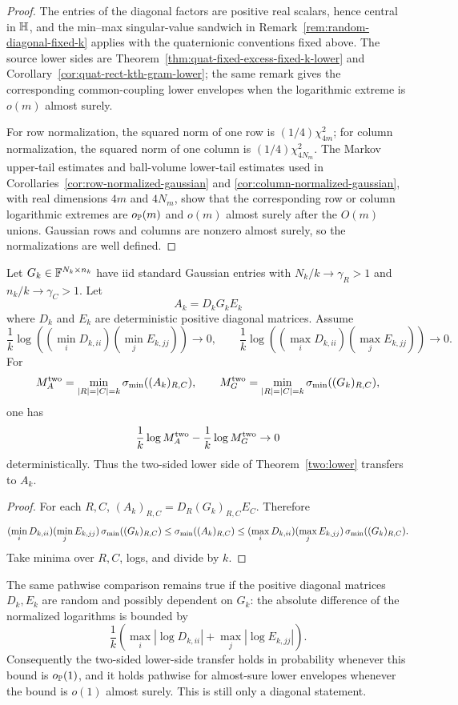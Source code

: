 \begin{proof}
The entries of the diagonal factors are positive real scalars, hence central in
\(\mathbb{H}\), and the min--max singular-value sandwich in
Remark~\ref{rem:random-diagonal-fixed-k} applies with the quaternionic
conventions fixed above.  The source lower sides are
Theorem~\ref{thm:quat-fixed-excess-fixed-k-lower} and
Corollary~\ref{cor:quat-rect-kth-gram-lower}; the same remark gives the
corresponding common-coupling lower envelopes when the logarithmic extreme is
\(o(m)\) almost surely.

For row normalization, the squared norm of one row is \((1/4)\chi^2_{4m}\); for
column normalization, the squared norm of one column is \((1/4)\chi^2_{4N_m}\).
The Markov upper-tail estimates and ball-volume lower-tail estimates used in
Corollaries~\ref{cor:row-normalized-gaussian} and
\ref{cor:column-normalized-gaussian}, with real dimensions \(4m\) and \(4N_m\),
show that the corresponding row or column logarithmic extremes are \(o_{\mathbb{P}}(m)\)
and \(o(m)\) almost surely after the \(O(m)\) unions.  Gaussian rows and columns
are nonzero almost surely, so the normalizations are well defined.
\end{proof}

\begin{corollary}\label{cor:two-sided-diagonal-transfer}
Let \(G_k\in\mathbb{F}^{N_k\times n_k}\) have iid standard Gaussian entries with
\(N_k/k\to\gamma_R>1\) and \(n_k/k\to\gamma_C>1\).  Let
\[
  A_k=D_kG_kE_k
\]
where \(D_k\) and \(E_k\) are deterministic positive diagonal matrices.  Assume
\[
  \frac1k\log\!\left((\min_i D_{k,ii})(\min_j E_{k,jj})\right)\to0,\qquad
  \frac1k\log\!\left((\max_i D_{k,ii})(\max_j E_{k,jj})\right)\to0.
\]
For
\[
  M_A^{\rm two}=\min_{|R|=|C|=k}\sigma_{\min}((A_k)_{R,C}),\qquad
  M_G^{\rm two}=\min_{|R|=|C|=k}\sigma_{\min}((G_k)_{R,C}),
\]
one has
\[
  \frac1k\log M_A^{\rm two}-\frac1k\log M_G^{\rm two}\to0
\]
deterministically.  Thus the two-sided lower side of
Theorem~\ref{two:lower} transfers to \(A_k\).
\end{corollary}

\begin{proof}
For each \(R,C\), \((A_k)_{R,C}=D_R(G_k)_{R,C}E_C\).  Therefore
\[
  (\min_i D_{k,ii})(\min_j E_{k,jj})\,\sigma_{\min}((G_k)_{R,C})
  \le \sigma_{\min}((A_k)_{R,C})
  \le
  (\max_i D_{k,ii})(\max_j E_{k,jj})\,\sigma_{\min}((G_k)_{R,C}).
\]
Take minima over \(R,C\), logs, and divide by \(k\).
\end{proof}

The same pathwise comparison remains true if the positive diagonal matrices
\(D_k,E_k\) are random and possibly dependent on \(G_k\): the absolute
difference of the normalized logarithms is bounded by
\[
  \frac1k\left(\max_i|\log D_{k,ii}|+\max_j|\log E_{k,jj}|\right).
\]
Consequently the two-sided lower-side transfer holds in probability whenever
this bound is \(o_{\mathbb{P}}(1)\), and it holds pathwise for almost-sure lower
envelopes whenever the bound is \(o(1)\) almost surely.  This is still only a
diagonal statement.

